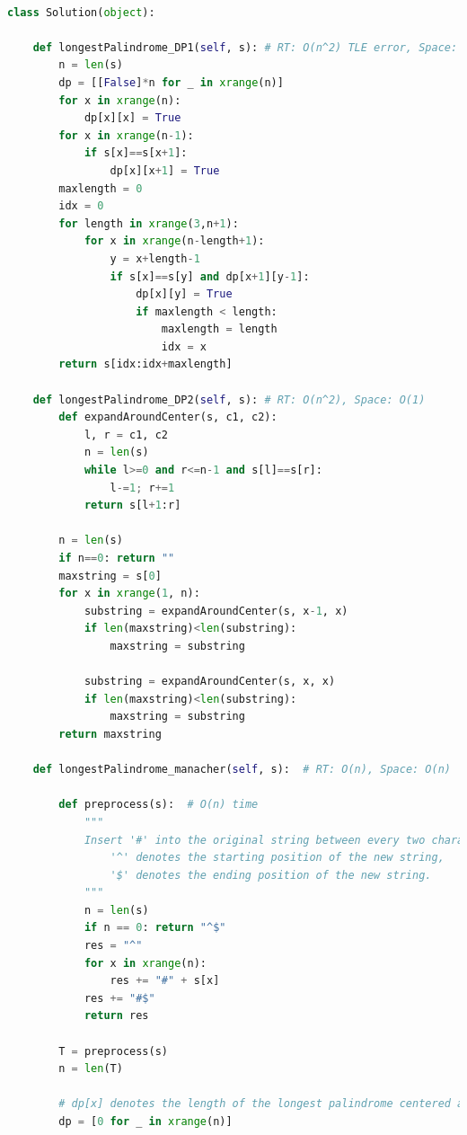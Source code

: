 \documentclass[a4paper,10pt]{article}
\begin{document}
\begin{lstlisting}[language=Python, caption=Problem5. Longest Palindromic Substring]

class Solution(object):

    def longestPalindrome_DP1(self, s): # RT: O(n^2) TLE error, Space: O(n^2)
        n = len(s)
        dp = [[False]*n for _ in xrange(n)]
        for x in xrange(n):
            dp[x][x] = True
        for x in xrange(n-1):
            if s[x]==s[x+1]:
                dp[x][x+1] = True
        maxlength = 0
        idx = 0
        for length in xrange(3,n+1):
            for x in xrange(n-length+1):
                y = x+length-1
                if s[x]==s[y] and dp[x+1][y-1]:
                    dp[x][y] = True
                    if maxlength < length:
                        maxlength = length
                        idx = x
        return s[idx:idx+maxlength]

    def longestPalindrome_DP2(self, s): # RT: O(n^2), Space: O(1)
        def expandAroundCenter(s, c1, c2):
            l, r = c1, c2
            n = len(s)
            while l>=0 and r<=n-1 and s[l]==s[r]:
                l-=1; r+=1
            return s[l+1:r]
            
        n = len(s)
        if n==0: return ""
        maxstring = s[0]
        for x in xrange(1, n):
            substring = expandAroundCenter(s, x-1, x)
            if len(maxstring)<len(substring):
                maxstring = substring
            
            substring = expandAroundCenter(s, x, x)
            if len(maxstring)<len(substring):
                maxstring = substring
        return maxstring
    
    def longestPalindrome_manacher(self, s):  # RT: O(n), Space: O(n)

        def preprocess(s):  # O(n) time
            """
            Insert '#' into the original string between every two characters:
                '^' denotes the starting position of the new string,
                '$' denotes the ending position of the new string.
            """
            n = len(s)
            if n == 0: return "^$"
            res = "^"
            for x in xrange(n):
                res += "#" + s[x]
            res += "#$"
            return res

        T = preprocess(s)
        n = len(T)

        # dp[x] denotes the length of the longest palindrome centered at T[x]
        dp = [0 for _ in xrange(n)]


\end{lstlisting}
\end{document}
